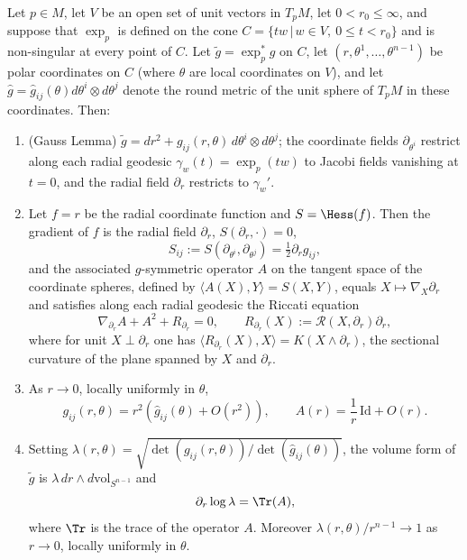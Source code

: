 \begin{lemma}
\label{lem:geodesic-polar-form}
Let $p\in M$, let $V$ be an open set of unit vectors in $T_pM$, let
$0<r_0\le\infty$, and suppose that $\exp_p$ is defined on the cone
$C=\{tw\,|\,w\in V,\ 0\le t<r_0\}$ and is non-singular at every
point of $C$. Let $\tilde g=\exp_p^*g$ on $C$, let
$(r,\theta^1,\ldots,\theta^{n-1})$ be polar coordinates on $C$
(where $\theta$ are local coordinates on $V$), and let $\hat
g=\hat g_{ij}(\theta)d\theta^i\otimes d\theta^j$ denote the round
metric of the unit sphere of $T_pM$ in these coordinates. Then:
\begin{enumerate}
\item (Gauss Lemma) $\tilde g=dr^2+g_{ij}(r,\theta)\,
d\theta^i\otimes d\theta^j$; the coordinate fields
$\partial_{\theta^i}$ restrict along each radial geodesic
$\gamma_w(t)=\exp_p(tw)$ to Jacobi fields vanishing at $t=0$, and
the radial field $\partial_r$ restricts to $\gamma_w'$.
\item Let $f=r$ be the radial coordinate function and
$S=\Hess(f)$. Then the gradient of $f$ is the radial field
$\partial_r$, $S(\partial_r,\cdot)=0$,
$$S_{ij}:=S(\partial_{\theta^i},\partial_{\theta^j})
=\tfrac{1}{2}\partial_rg_{ij},$$
and the associated $g$-symmetric operator $A$ on the tangent space
of the coordinate spheres, defined by $\langle
A(X),Y\rangle=S(X,Y)$, equals $X\mapsto\nabla_X\partial_r$ and
satisfies along each radial geodesic the Riccati equation
$$\nabla_{\partial_r}A+A^2+R_{\partial_r}=0,\qquad
R_{\partial_r}(X):={\mathcal R}(X,\partial_r)\partial_r,$$
where for unit $X\perp\partial_r$ one has $\langle
R_{\partial_r}(X),X\rangle=K(X\wedge\partial_r)$, the sectional
curvature of the plane spanned by $X$ and $\partial_r$.
\item As $r\to0$, locally uniformly in $\theta$,
$$g_{ij}(r,\theta)=r^2\left(\hat g_{ij}(\theta)+O(r^2)\right),
\qquad A(r)=\frac{1}{r}\,\mathrm{Id}+O(r).$$
\item Setting $\lambda(r,\theta)
=\sqrt{\det\left(g_{ij}(r,\theta)\right)/\det\left(\hat
g_{ij}(\theta)\right)}$, the volume form of $\tilde g$ is
$\lambda\, dr\wedge d\mathrm{vol}_{S^{n-1}}$ and
$$\partial_r\log\lambda=\Tr(A),$$
where $\Tr$ is the trace of the operator $A$. Moreover
$\lambda(r,\theta)/r^{n-1}\to 1$ as $r\to 0$, locally uniformly in
$\theta$.
\end{enumerate}
\end{lemma}

